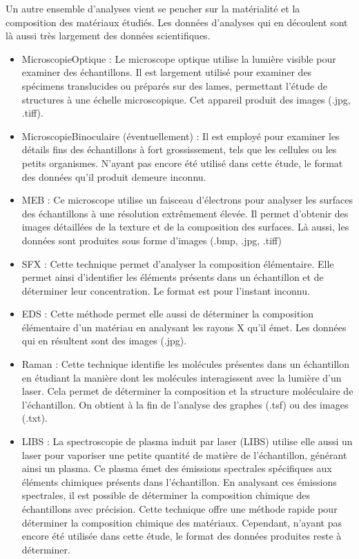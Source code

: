 Un autre ensemble d’analyses vient se pencher sur la matérialité et la composition des matériaux étudiés. Les données d’analyses qui en découlent sont là aussi très largement des données scientifiques.\\

\begin{itemize}
    \item \gls{MicroscopieOptique} : Le microscope optique utilise la lumière visible pour examiner des échantillons. Il est largement utilisé pour examiner des spécimens translucides ou préparés sur des lames, permettant l'étude de structures à une échelle microscopique. Cet appareil produit des images (.jpg, .tiff).\\
    \item \gls{MicroscopieBinoculaire} (éventuellement) : Il est employé pour examiner les détails fins des échantillons à fort grossissement, tels que les cellules ou les petits organismes. N'ayant pas encore été utilisé dans cette étude, le format des données qu'il produit demeure inconnu.\\
    \item \gls{MEB} : Ce microscope utilise un faisceau d'électrons pour analyser les surfaces des échantillons à une résolution extrêmement élevée. Il permet d'obtenir des images détaillées de la texture et de la composition des surfaces. Là aussi, les données sont produites sous forme d’images (.bmp, .jpg, .tiff)\\
    \item \gls{SFX} : Cette technique permet d'analyser la composition élémentaire. Elle permet ainsi d'identifier les éléments présents dans un échantillon et de déterminer leur concentration. Le format est pour l'instant inconnu.
    \item \gls{EDS} : Cette méthode permet elle aussi de déterminer la composition élémentaire d'un matériau en analysant les rayons X qu'il émet. Les données qui en résultent sont des images (.jpg).\\
    \item \gls{Raman} : Cette technique identifie les molécules présentes dans un échantillon en étudiant la manière dont les molécules interagissent avec la lumière d’un laser. Cela permet de déterminer la composition et la structure moléculaire de l'échantillon. On obtient à la fin de l’analyse des graphes (.tsf) ou des images (.txt).\\
    \item \gls{LIBS} : La spectroscopie de plasma induit par laser (LIBS) utilise elle aussi un laser pour vaporiser une petite quantité de matière de l'échantillon, générant ainsi un plasma. Ce plasma émet des émissions spectrales spécifiques aux éléments chimiques présents dans l'échantillon. En analysant ces émissions spectrales, il est possible de déterminer la composition chimique des échantillons avec précision. Cette technique offre une méthode rapide pour déterminer la composition chimique des matériaux. Cependant, n'ayant pas encore été utilisée dans cette étude, le format des données produites reste à déterminer.\\

\end{itemize}
